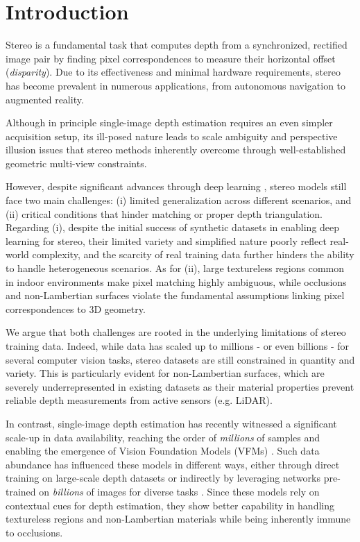 \documentclass[10pt,twocolumn,letterpaper]{article}
\begin{document}
\section{Introduction}
\label{sec:intro}

Stereo is a fundamental task that computes depth from a synchronized, rectified image pair by finding pixel correspondences to measure their horizontal offset (\textit{disparity}). Due to its effectiveness and minimal hardware requirements, stereo has become prevalent in numerous applications, from autonomous navigation to augmented reality.

Although in principle single-image depth estimation \cite{arampatzakis2023monocular} requires an even simpler acquisition setup, its ill-posed nature leads to scale ambiguity and perspective illusion issues that stereo methods inherently overcome through well-established geometric multi-view constraints.

However, despite significant advances through deep learning \cite{laga2020survey,poggi2021synergies}, stereo models still face two main challenges: (i) limited generalization across different scenarios, and (ii) critical conditions that hinder matching or proper depth triangulation.
Regarding (i), despite the initial success of synthetic datasets in enabling deep learning for stereo, their limited variety and simplified nature poorly reflect real-world complexity, and the scarcity of real training data further hinders the ability to handle heterogeneous scenarios. As for (ii), large textureless regions common in indoor environments make pixel matching highly ambiguous, while occlusions and non-Lambertian surfaces \cite{zamaramirez2022booster,zamaramirez2024booster,wen2024layeredflow} violate the fundamental assumptions linking pixel correspondences to 3D geometry.

We argue that both challenges are rooted in the underlying limitations of stereo training data. Indeed, while data has scaled up to millions - or even billions - for several computer vision tasks, stereo datasets are still constrained in quantity and variety.
This is particularly evident for non-Lambertian surfaces, which are severely underrepresented in existing datasets as their material properties prevent reliable depth measurements from active sensors (e.g. LiDAR).

In contrast, single-image depth estimation has recently witnessed a significant scale-up in data availability, reaching the order of \textit{millions} of samples and enabling the emergence of Vision Foundation Models (VFMs) \cite{depth_anything_v1,depth_anything_v2,ke2023repurposing,fu2024geowizard}. Such data abundance has influenced these models in different ways, either through direct training on large-scale depth datasets  \cite{depth_anything_v1,depth_anything_v2} or indirectly by leveraging networks pre-trained on \textit{billions} of images for diverse tasks \cite{ke2023repurposing,fu2024geowizard}.
Since these models rely on contextual cues for depth estimation, they show better capability in handling textureless regions and non-Lambertian materials \cite{roberts2021,Ramirez_2023_CVPR,Ramirez2024,zamaramirez2024tricky} while being inherently immune to occlusions.
\end{document}
